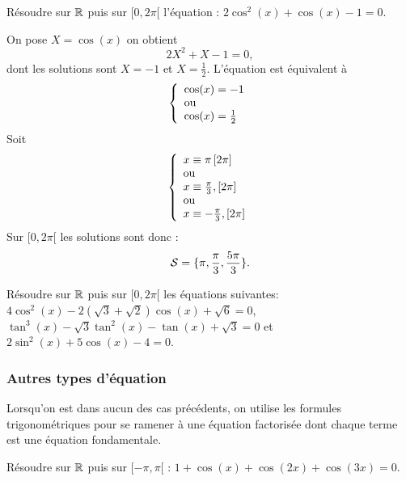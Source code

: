 \documentclass[a4paper, 11pt]{article}
\begin{document}
\begin{exemple}
R\'esoudre sur $\mathbb{R}$ puis sur $\lbrack 0,2\pi\lbrack$ l'\'equation : $2\cos^2 (x) + \cos (x) -1 = 0$. 

\end{exemple}
\begin{cor}
On pose $X=\cos(x)$ on obtient 
$$2X^2+X-1=0,$$
dont les solutions sont $X =-1$ et $X=\frac{1}{2}$. L'équation est équivalent à 
$$
\left\{ \begin{array}{l}
\cos(x) = -1\\
\textmd{ou }\\
\cos(x) = \frac{1}{2}
\end{array}\right.$$
Soit 
$$
\left\{ \begin{array}{l}
x \equiv  \pi\, [2\pi] \\
\textmd{ou }\\
x \equiv \frac{\pi}{3}, [2\pi] \\
\textmd{ou }\\
x \equiv -\frac{\pi}{3}, [2\pi] 
\end{array}\right.$$
Sur $[0,2\pi[$ les solutions sont donc :
$$\mathcal{S}=\{ \pi, \frac{\pi}{3}, \frac{5\pi}{3}\}.$$

\end{cor}


{\footnotesize
\begin{exo} R\'esoudre sur $\mathbb{R}$ puis sur $\lbrack 0,2\pi\lbrack$ les \'equations suivantes: $4\cos^2{(x)}-2(\sqrt{3}+\sqrt{2})\cos{(x)}+\sqrt{6}=0$, $\tan^3{(x)}-\sqrt{3}\tan^2{(x)}-\tan{(x)}+\sqrt{3}=0$ et $2\sin^2{(x)}+5\cos{(x)}-4=0$.
\end{exo}}
\vspace{0.3cm}





\subsubsection{Autres types d'\'equation}

\noindent Lorsqu'on est dans aucun des cas pr\'ec\'edents, on utilise les formules trigonom\'etriques pour se ramener \`a une \'equation factoris\'ee dont chaque terme est une \'equation fondamentale.

\begin{exemple}
R\'esoudre sur $\mathbb{R}$ puis sur $\lbrack -\pi,\pi\lbrack$ : $1+\cos{(x)}+\cos{(2x)}+\cos{(3x)}=0$.

\end{exemple}
\end{document}
